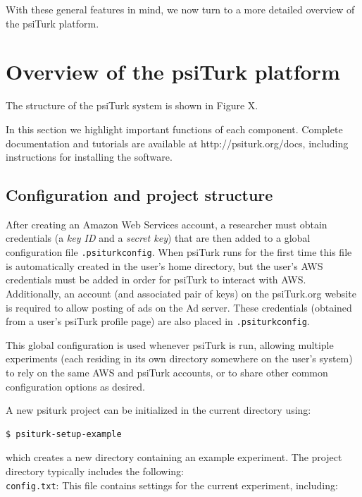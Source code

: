 \documentclass[twocolumn]{svjour3}          %
\begin{document}
With these general features in mind, we now turn to a more detailed overview of the 
\textsf{psiTurk} platform.

\section{Overview of the \textsf{psiTurk} platform}

The structure of the psiTurk system is shown in Figure X.

In this section we highlight important functions of each component.
Complete documentation and tutorials are available at http://psiturk.org/docs, including instructions for installing the software.

\subsection{Configuration and project structure}

After creating an Amazon Web Services account, a researcher must obtain credentials (a \emph{key ID} and a \emph{secret key}) that are then added to a global configuration file \texttt{.psiturkconfig}.
When psiTurk runs for the first time this file is automatically created in the user's home directory, but the user's AWS credentials must be added in order for psiTurk to interact with AWS.
Additionally, an account (and associated pair of keys) on the psiTurk.org website is required to allow posting of ads on the Ad server.
These credentials (obtained from a user's psiTurk profile page) are also placed in \texttt{.psiturkconfig}.

This global configuration is used whenever psiTurk is run, allowing multiple experiments (each residing in its own directory somewhere on the user's system) to rely on the same AWS and psiTurk accounts, or to share other common configuration options as desired.

A new psiturk project can be initialized in the current directory using:

\begin{lstlisting}
$ psiturk-setup-example
\end{lstlisting}

\noindent which creates a new directory containing an example experiment.
The project directory typically includes the following: \\


\noindent \texttt{config.txt}: This file contains settings for the current experiment, including:
\end{document}

